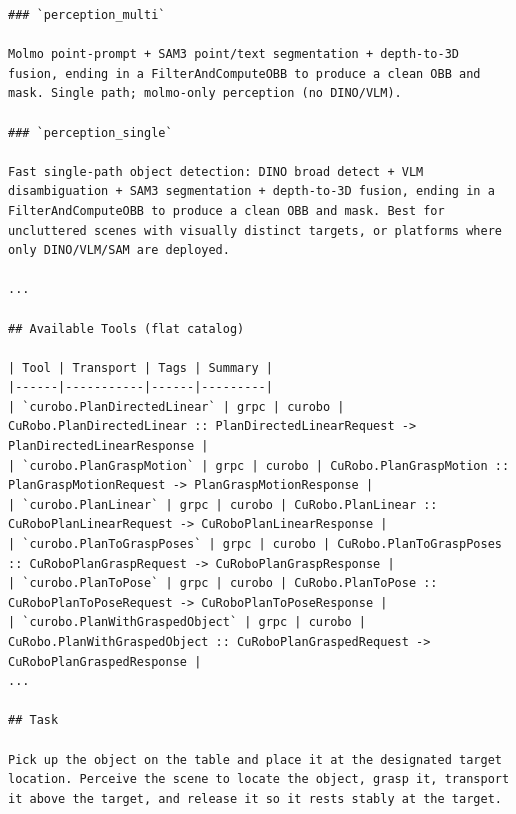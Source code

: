 \begin{lstlisting}
### `perception_multi`

Molmo point-prompt + SAM3 point/text segmentation + depth-to-3D fusion, ending in a FilterAndComputeOBB to produce a clean OBB and mask. Single path; molmo-only perception (no DINO/VLM).

### `perception_single`

Fast single-path object detection: DINO broad detect + VLM disambiguation + SAM3 segmentation + depth-to-3D fusion, ending in a FilterAndComputeOBB to produce a clean OBB and mask. Best for uncluttered scenes with visually distinct targets, or platforms where only DINO/VLM/SAM are deployed.

...

## Available Tools (flat catalog)

| Tool | Transport | Tags | Summary |
|------|-----------|------|---------|
| `curobo.PlanDirectedLinear` | grpc | curobo | CuRobo.PlanDirectedLinear :: PlanDirectedLinearRequest -> PlanDirectedLinearResponse |
| `curobo.PlanGraspMotion` | grpc | curobo | CuRobo.PlanGraspMotion :: PlanGraspMotionRequest -> PlanGraspMotionResponse |
| `curobo.PlanLinear` | grpc | curobo | CuRobo.PlanLinear :: CuRoboPlanLinearRequest -> CuRoboPlanLinearResponse |
| `curobo.PlanToGraspPoses` | grpc | curobo | CuRobo.PlanToGraspPoses :: CuRoboPlanGraspRequest -> CuRoboPlanGraspResponse |
| `curobo.PlanToPose` | grpc | curobo | CuRobo.PlanToPose :: CuRoboPlanToPoseRequest -> CuRoboPlanToPoseResponse |
| `curobo.PlanWithGraspedObject` | grpc | curobo | CuRobo.PlanWithGraspedObject :: CuRoboPlanGraspedRequest -> CuRoboPlanGraspedResponse |
...

## Task

Pick up the object on the table and place it at the designated target location. Perceive the scene to locate the object, grasp it, transport it above the target, and release it so it rests stably at the target.

\end{lstlisting}